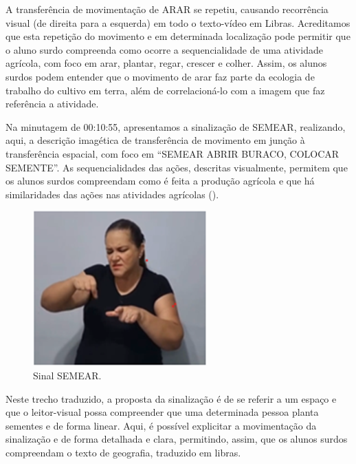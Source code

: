 \documentclass[portuguese]{textolivre}
\begin{document}
A transferência de movimentação de ARAR se repetiu, causando recorrência visual (de direita para a esquerda) em todo o texto-vídeo em Libras. Acreditamos que esta repetição do movimento e em determinada localização pode permitir que o aluno surdo compreenda como ocorre a sequencialidade de uma atividade agrícola, com foco em arar, plantar, regar, crescer e colher. Assim, os alunos surdos podem entender que o movimento de arar faz parte da ecologia de trabalho do cultivo em terra, além de correlacioná-lo com a imagem que faz referência a atividade.

Na minutagem de 00:10:55, apresentamos a sinalização de SEMEAR, realizando, aqui, a descrição imagética de transferência de movimento em junção à transferência espacial, com foco em “SEMEAR ABRIR BURACO, COLOCAR SEMENTE”. As sequencialidades das ações, descritas visualmente, permitem que os alunos surdos compreendam como é feita a produção agrícola e que há similaridades das ações nas atividades agrícolas ().

\begin{figure}[h!]
    \centering
    \begin{minipage}{.3\textwidth}
    \includegraphics[width=\linewidth]{Fig11.png}
    \caption{Sinal SEMEAR.}
    \label{fig11}
    \end{minipage}
\end{figure}

Neste trecho traduzido, a proposta da sinalização é de se referir a um espaço e que o leitor-visual possa compreender que uma determinada pessoa planta sementes e de forma linear. Aqui, é possível explicitar a movimentação da sinalização e de forma detalhada e clara, permitindo, assim, que os alunos surdos compreendam o texto de geografia, traduzido em libras.
\end{document}
